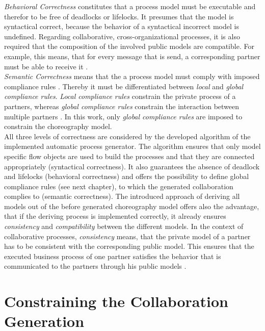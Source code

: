 \textit{Behavioral Correctness} constitutes that a process model must be executable and therefor to be free of deadlocks or lifelocks. It presumes that the model is syntactical correct, because the behavior of a syntactical incorrect model is undefined. Regarding collaborative, cross-organizational processes, it is also required that the composition of the involved public models are compatible. For example, this means, that for every message that is send, a corresponding partner must be able to receive it \cite{sabrina1174, sabrina848}. \\

\textit{Semantic Correctness} means that the a process model must comply with imposed compliance rules \cite{sabrina848}. Thereby it must be differentiated between \textit{local} and \textit{global compliance rules}. \textit{Local compliance rules} constrain the private process of a partners, whereas \textit{global compliance rules} constrain the interaction between multiple partners \cite{sabrina1174}. In this work, only \textit{global compliance rules} are imposed to constrain the choreography model. \\

All three levels of correctness are considered by the developed algorithm of the implemented automatic process generator. The algorithm ensures that only model specific flow objects are used to build the processes and that they are connected appropriately (syntactical correctness). It also guarantees the absence of deadlock and lifelocks (behavioral correctness) and offers the possibility to define global compliance rules (see next chapter), to which the generated collaboration complies to (semantic correctness). The introduced approach of deriving all models out of the before generated choreography model offers also the advantage, that if the deriving process is implemented correctly, it already ensures \textit{consistency} and \textit{compatibility} between the different models. In the context of collaborative processes, \textit{consistency} means, that the private model of a partner has to be consistent with the corresponding public model. This ensures that the executed business process of one partner satisfies the behavior that is communicated to the partners through his public models \cite{sabrina1174}. \\

\section{Constraining the Collaboration Generation}

